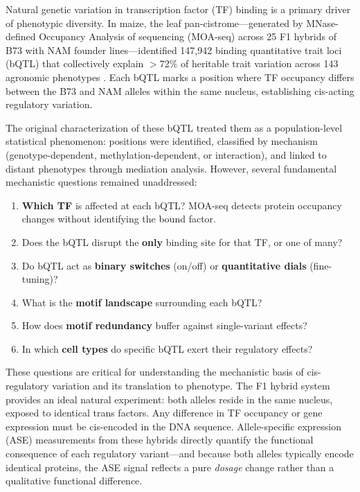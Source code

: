 \documentclass[11pt,a4paper]{article}
\begin{document}
Natural genetic variation in transcription factor (TF) binding is a primary driver of phenotypic diversity. In maize, the leaf pan-cistrome---generated by MNase-defined Occupancy Analysis of sequencing (MOA-seq) across 25 F1 hybrids of B73 with NAM founder lines---identified 147,942 binding quantitative trait loci (bQTL) that collectively explain $>$72\% of heritable trait variation across 143 agronomic phenotypes \citep{engelhorn2025}. Each bQTL marks a position where TF occupancy differs between the B73 and NAM alleles within the same nucleus, establishing cis-acting regulatory variation.

The original characterization of these bQTL treated them as a population-level statistical phenomenon: positions were identified, classified by mechanism (genotype-dependent, methylation-dependent, or interaction), and linked to distant phenotypes through mediation analysis. However, several fundamental mechanistic questions remained unaddressed:

\begin{enumerate}
    \item \textbf{Which TF} is affected at each bQTL? MOA-seq detects protein occupancy changes without identifying the bound factor.
    \item Does the bQTL disrupt the \textbf{only} binding site for that TF, or one of many?
    \item Do bQTL act as \textbf{binary switches} (on/off) or \textbf{quantitative dials} (fine-tuning)?
    \item What is the \textbf{motif landscape} surrounding each bQTL?
    \item How does \textbf{motif redundancy} buffer against single-variant effects?
    \item In which \textbf{cell types} do specific bQTL exert their regulatory effects?
\end{enumerate}

These questions are critical for understanding the mechanistic basis of cis-regulatory variation and its translation to phenotype. The F1 hybrid system provides an ideal natural experiment: both alleles reside in the same nucleus, exposed to identical trans factors. Any difference in TF occupancy or gene expression must be cis-encoded in the DNA sequence. Allele-specific expression (ASE) measurements from these hybrids directly quantify the functional consequence of each regulatory variant---and because both alleles typically encode identical proteins, the ASE signal reflects a pure \textit{dosage} change rather than a qualitative functional difference.
\end{document}
